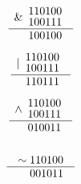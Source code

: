 \noindent
\begin{minipage}{.25\textwidth}
$$\def\arraystretch{.8}
\begin{array}{r}
\&
\begin{array}{r}
110100\\

100111\\
\end{array}\\
\hline
\def\arraystretch{.2}
\begin{array}{r}\\
100100
\end{array}
\end{array}
$$
\end{minipage}
\begin{minipage}{.25\textwidth}
$$\def\arraystretch{.8}
\begin{array}{r}
|
\begin{array}{r}
110100\\

100111\\
\end{array}\\
\hline
\def\arraystretch{.2}
\begin{array}{r}\\
110111
\end{array}
\end{array}
$$
\end{minipage}
\begin{minipage}{.25\textwidth}
$$\def\arraystretch{.8}
\begin{array}{r}
\wedge
\begin{array}{r}
110100\\

100111\\
\end{array}\\
\hline
\def\arraystretch{.2}
\begin{array}{r}\\
010011
\end{array}
\end{array}
$$
\end{minipage}
\begin{minipage}{.25\textwidth}
$$\def\arraystretch{.8}
\begin{array}{r}
\begin{array}{r}
{}\\
\sim110100
\end{array}\\
\hline
\def\arraystretch{.2}
\begin{array}{r}\\
001011
\end{array}
\end{array}
$$
\end{minipage}

